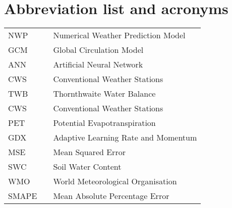 \chapter*{Abbreviation list and acronyms}

\vspace*{-0.5cm}

\onehalfspacing


\noindent
\begin{tabular}{l c p{.85\linewidth}}
NWP                & & Numerical Weather Prediction Model\\

GCM                & & Global Circulation Model\\

ANN                & & Artificial Neural Network\\

CWS                & & Conventional Weather Stations\\

TWB                & & Thornthwaite  Water Balance\\

CWS                & & Conventional Weather Stations\\

PET                & & Potential Evapotranspiration\\

GDX                & & Adaptive Learning Rate and Momentum\\

MSE                & & Mean Squared Error\\ 

SWC                & & Soil Water Content\\ 

WMO                & & World Meteorological Organisation\\ 

SMAPE              & & Mean Absolute Percentage Error\\ 



\end{tabular}

%
 
